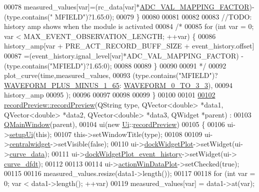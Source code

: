 \begin{DoxyCode}
00078         measured\_values[var]=(rc\_data[var]*\hyperlink{a00086_ada92d3eeeec0cbeee41e76a52d145792}{ADC\_VAL\_MAPPING\_FACTOR})-(type.contains(\textcolor{stringliteral}{"
      MFIELD"})?1.65:0);
00079     \}
00080 
00081 
00082 
00083     \textcolor{comment}{//TODO: history amp shows when the module is activated}
00084     \textcolor{comment}{/*}
00085 \textcolor{comment}{    for (int var = 0; var < MAX\_EVENT\_OBSERVATION\_LENGTH; ++var) \{}
00086 \textcolor{comment}{        history\_amp[var + PRE\_ACT\_RECORD\_BUFF\_SIZE + event\_history.offset]}
00087 \textcolor{comment}{                =(event\_history.ignal\_level[var]*ADC\_VAL\_MAPPING\_FACTOR) -
       (type.contains("MFIELD")?1.65:0);}
00088 \textcolor{comment}{}
00089 \textcolor{comment}{    \}}
00090 \textcolor{comment}{}
00091 \textcolor{comment}{    */}
00092     plot\_curve(time,measured\_values,
00093               (type.contains(\textcolor{stringliteral}{"MFIELD"})?\hyperlink{a00090_a0923d3b365a36e1e8c401cec964aa36f}{WAVEFORM\_PLUS\_MINUS\_1\_65}:
      \hyperlink{a00090_ae18fed2471b16a8516d721ff60671dd9}{WAVEFORM\_0\_TO\_3\_3}),
00094               history\_amp
00095               );
00096 
00097 
00098 
00099 \}
00100 
00101 
\hypertarget{a00129_source_l00102}{}\hyperlink{a00073_a3f26cea2101bdab013aa02f1c73e41b9}{00102} \hyperlink{a00073_a03ad4ae83a5594f6dc337c7b71873edd}{recordPreview::recordPreview}(QString type, QVector<double> *data1, 
      QVector<double> *data2, QVector<double> *data3, QWidget *parent) :
00103     \hyperlink{a00058}{QMainWindow}(parent),
00104     ui(new \hyperlink{a00145}{Ui}::\hyperlink{a00073}{recordPreview})
00105 \{
00106     ui->\hyperlink{a00081_afa41dc070a896a5eae476f3c0206825c}{setupUi}(\textcolor{keyword}{this});
00107     this->setWindowTitle(type);
00108 
00109     ui->\hyperlink{a00081_ac9ab4609922159e8e4cc45905f76928e}{centralwidget}->setVisible(\textcolor{keyword}{false});
00110     ui->\hyperlink{a00081_a07b76f17803ec09e0367b72938bbd097}{dockWidgetPlot}->setWidget(ui->\hyperlink{a00081_a247d94481323c0bc4f8b6458a8a535dd}{curve\_data});
00111     ui->\hyperlink{a00081_a2a8f7ee8d4458dd20481c8a1c29ce185}{dockWidgetPlot\_event\_history}->setWidget(ui->
      \hyperlink{a00081_a43d24fa14d90cc27b310542e39dcdd1b}{curve\_dfdt});
00112 
00113 
00114     ui->\hyperlink{a00081_aa09067a9c96c9cd78f75261a9fcb89f0}{actionWinDataPlot}->setChecked(\textcolor{keyword}{true});
00115 
00116     measured\_values.resize(data1->length());
00117 
00118     \textcolor{keywordflow}{for} (\textcolor{keywordtype}{int} var = 0; var < data1->length(); ++var)
00119       measured\_values[var] = data1->at(var);

\end{DoxyCode}
